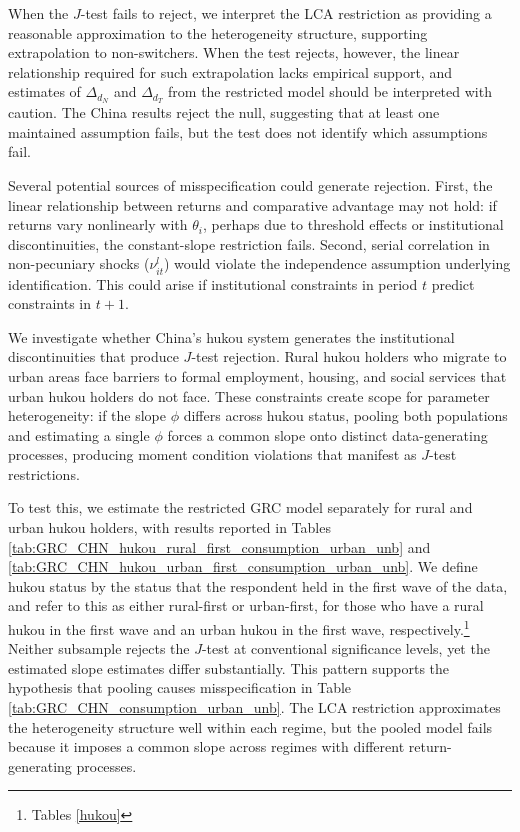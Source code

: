 \documentclass[12pt]{article}
\begin{document}
When the $J$-test fails to reject, we interpret the LCA restriction as providing a reasonable approximation to the heterogeneity structure, supporting extrapolation to non-switchers. 
When the test rejects, however, the linear relationship required for such extrapolation lacks empirical support, and estimates of $\Delta_{d_N}$ and $\Delta_{d_T}$ from the restricted model should be interpreted with caution.
The China results reject the null, suggesting that at least one maintained assumption fails, but the test does not identify which assumptions fail. 

Several potential sources of misspecification could generate rejection. 
First, the linear relationship between returns and comparative advantage may not hold: if returns vary nonlinearly with $\theta_i$, perhaps due to threshold effects or institutional discontinuities, the constant-slope restriction fails.
Second, serial correlation in non-pecuniary shocks ($\nu_{it}^l$) would violate the independence assumption underlying identification. 
This could arise if institutional constraints in period $t$ predict constraints in $t+1$.

We investigate whether China's hukou system generates the institutional discontinuities that produce $J$-test rejection.
Rural hukou holders who migrate to urban areas face barriers to formal employment, housing, and social services that urban hukou holders do not face.
These constraints create scope for parameter heterogeneity: if the slope $\phi$ differs across hukou status, pooling both populations and estimating a single $\phi$ forces a common slope onto distinct data-generating processes, producing moment condition violations that manifest as $J$-test restrictions.


To test this, we estimate the restricted GRC model separately for rural and urban hukou holders, with results reported in Tables \ref{tab:GRC_CHN_hukou_rural_first_consumption_urban_unb} and \ref{tab:GRC_CHN_hukou_urban_first_consumption_urban_unb}. 
We define hukou status by the status that the respondent held in the first wave of the data, and refer to this as either rural-first or urban-first, for those who have a rural hukou in the first wave and an urban hukou in the first wave, respectively.\footnote{Tables \ref{hukou}}
Neither subsample rejects the $J$-test at conventional significance levels, yet the estimated slope estimates differ substantially. %
This pattern supports the hypothesis that pooling causes misspecification in Table \ref{tab:GRC_CHN_consumption_urban_unb}.
The LCA restriction approximates the heterogeneity structure well within each regime, but the pooled model fails because it imposes a common slope across regimes with different return-generating processes.
\end{document}
